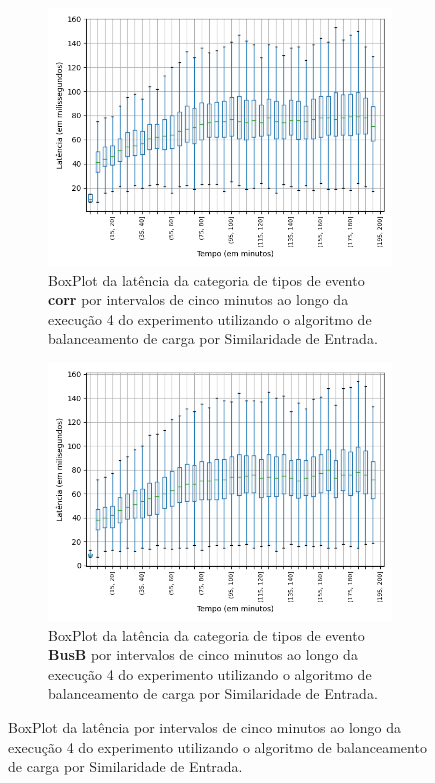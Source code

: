 \begin{figure}
\begin{subfigure}{.5\textwidth}
\centering
\includegraphics[width=\textwidth]{figuras/graphics/boxplot_9-dez-is_corr.png}
\caption{BoxPlot da latência da categoria de tipos de evento \textbf{corr} por intervalos de cinco minutos ao longo da execução 4 do experimento utilizando o algoritmo de balanceamento de carga por Similaridade de Entrada.}
\label{fig:BoxPlot_corr_IS_9-dez-is}
\end{subfigure}%
\begin{subfigure}{.5\textwidth}
\centering
\includegraphics[width=\textwidth]{figuras/graphics/boxplot_9-dez-is_busb.png}
\caption{BoxPlot da latência da categoria de tipos de evento \textbf{BusB} por intervalos de cinco minutos ao longo da execução 4 do experimento utilizando o algoritmo de balanceamento de carga por Similaridade de Entrada.}
\label{fig:BoxPlot_BusB_IS_9-dez-is}
\end{subfigure}%
\caption{BoxPlot da latência por intervalos de cinco minutos ao longo da execução 4 do experimento utilizando o algoritmo de balanceamento de carga por Similaridade de Entrada.}
\end{figure}



